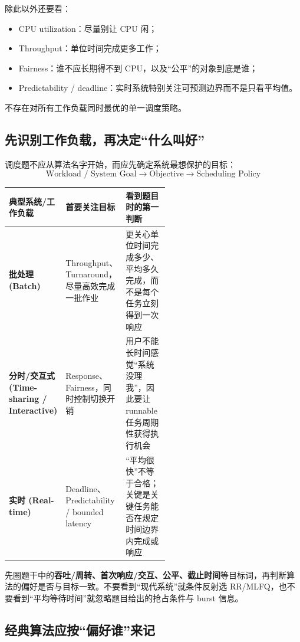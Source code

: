 \documentclass[11pt,a4paper]{ctexart}
\newcommand{\kw}[1]{\textbf{#1}}
\begin{document}
除此以外还要看：
\begin{itemize}
\item CPU utilization：尽量别让 CPU 闲；
\item Throughput：单位时间完成更多工作；
\item Fairness：谁不应长期得不到 CPU，以及“公平”的对象到底是谁；
\item Predictability / deadline：实时系统特别关注可预测边界而不是只看平均值。
\end{itemize}

不存在对所有工作负载同时最优的单一调度策略。

\subsection{先识别工作负载，再决定“什么叫好”}

调度题不应从算法名字开始，而应先确定系统最想保护的目标：
\[
\boxed{\text{Workload / System Goal}\rightarrow\text{Objective}\rightarrow\text{Scheduling Policy}}
\]

\begingroup
\small
\renewcommand{\arraystretch}{1.25}
\setlength{\tabcolsep}{5pt}
\begin{tabularx}{\linewidth}{>{\bfseries}p{0.23\linewidth} p{0.31\linewidth} X}
\toprule
典型系统/工作负载 & 首要关注目标 & 看到题目时的第一判断\\
\midrule
批处理 (Batch) & Throughput、Turnaround，尽量高效完成一批作业 & 更关心单位时间完成多少、平均多久完成，而不是每个任务立刻得到一次响应\\
分时/交互式 (Time-sharing / Interactive) & Response、Fairness，同时控制切换开销 & 用户不能长时间感觉“系统没理我”，因此要让 runnable 任务周期性获得执行机会\\
实时 (Real-time) & Deadline、Predictability / bounded latency & “平均很快”不等于合格；关键是关键任务能否在规定时间边界内完成或响应\\
\bottomrule
\end{tabularx}
\endgroup

\begin{exam}[调度算法选择题的第一动作]
先圈题干中的\kw{吞吐/周转、首次响应/交互、公平、截止时间}等目标词，再判断算法的偏好是否与目标一致。不要看到“现代系统”就条件反射选 RR/MLFQ，也不要看到“平均等待时间”就忽略题目给出的抢占条件与 burst 信息。
\end{exam}

\subsection{经典算法应按“偏好谁”来记}
\end{document}
